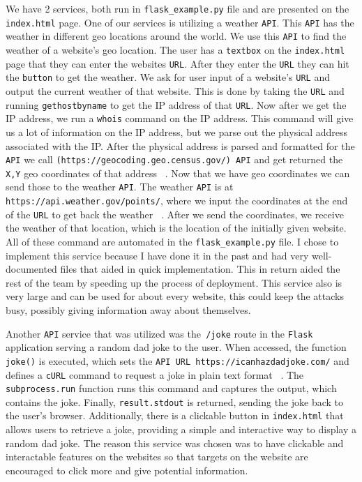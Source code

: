 We have 2 services, both run in \verb+flask_example.py+ file and are presented on the \verb+index.html+ page. One of our services is utilizing a weather \verb+API+. This \verb+API+ has the weather in different geo locations around the world. We use this \verb+API+ to find the weather of a website’s geo location. The user has a \verb+textbox+ on the \verb+index.html+ page that they can enter the websites \verb+URL+. After they enter the \verb+URL+ they can hit the \verb+button+ to get the weather. We ask for user input of a website's \verb+URL+ and output the current weather of that website. This is done by taking the \verb+URL+ and running \verb+gethostbyname+ to get the IP address of that \verb+URL+. Now after we get the IP address, we run a \verb+whois+ command on the IP address. This command will give us a lot of information on the IP address, but we parse out the physical address associated with the IP. After the physical address is parsed and formatted for the \verb+API+ we call \verb+(https://geocoding.geo.census.gov/) API+ and get returned the \verb+X,Y+ geo coordinates of that address ~\cite{GeoLocationAPI}. Now that we have geo coordinates we can send those to the weather \verb+API+. The weather \verb+API+ is at \verb+https://api.weather.gov/points/+, where we input the coordinates at the end of the \verb+URL+ to get back the weather ~\cite{WeahterAPI}. After we send the coordinates, we receive the weather of that location, which is the location of the initially given website. All of these command are automated in the \verb+flask_example.py+ file. I chose to implement this service because I have done it in the past and had very well-documented files that aided in quick implementation. This in return aided the rest of the team by speeding up the process of deployment. This service also is very large and can be used for about every website, this could keep the attacks busy, possibly giving information away about themselves.

Another \verb+API+ service that was utilized was the\verb+ /joke+ route in the \verb+Flask+ application serving a random dad joke to the user. When accessed, the function \verb+joke()+ is executed, which sets the \verb+API URL https://icanhazdadjoke.com/+ and defines a \verb+cURL+ command to request a joke in plain text format ~\cite{DadJokesAPI}. The \verb+subprocess.run+ function runs this command and captures the output, which contains the joke. Finally,  \verb+result.stdout+ is returned, sending the joke back to the user's browser. Additionally, there is a clickable button in \verb+index.html+ that allows users to retrieve a joke, providing a simple and interactive way to display a random dad joke. The reason this service was chosen was to have clickable and interactable features on the websites so that targets on the website are encouraged to click more and give potential information.



